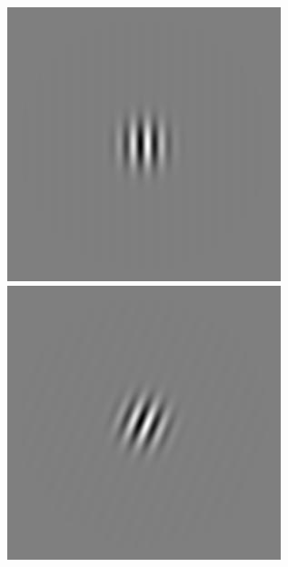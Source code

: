 \begin{figure}[ht]
\begin{center}
 \includegraphics[width=\columnwidth/9]{ch4/figures/rGabor3_0.jpg}
 \includegraphics[width=\columnwidth/9]{ch4/figures/rGabor3_1.jpg}

\end{center}
\end{figure}
